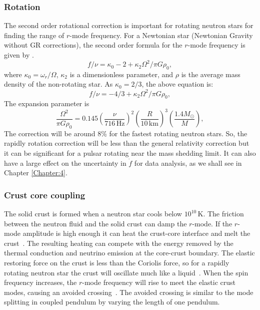 \documentclass{ttuthes2007}
\begin{document}
\subsubsection{Rotation}
The second order rotational correction is important for rotating neutron stars for finding the range of $r$-mode frequency.
For a  Newtonian star (Newtonian Gravity without \ac{GR} corrections), the second order formula for the $r$-mode frequency is given by 
\cite{Lindblom_1999}.
\begin{equation}
f/\nu=\kappa_0 - 2 + \kappa_2 \Omega^2/\pi G \rho_0,
\end{equation}
where $\kappa_0=\omega_r/\Omega$, $\kappa_2$ is a dimensionless parameter,
and $\rho$ is the average mass density of the non-rotating star.
As $\kappa_0=2/3$, the above equation is:
\begin{equation}
f/\nu = -4/3 + \kappa_2 \Omega^2/\pi G \rho_0,
\end{equation}
The expansion parameter is
\begin{equation}
\frac{\Omega^2}{\pi G \rho_0}=0.145 \left(\frac{\nu}{716\,\mathrm{Hz}}\right)^2
\left(\frac{R}{10\,\mathrm{km}}\right)^3 \left(\frac{1.4M_\odot}{M}\right),
\end{equation}
The correction
will be around 8\% for the fastest rotating neutron stars. So, the rapidly rotation correction will be less than the general relativity correction but it can be
significant for a pulsar rotating near the mass shedding limit. It can also have
a large effect on the uncertainty in $\dot{f}$ for data analysis, as we shall
see in Chapter \ref{Chapter:4}.

\subsubsection{Crust core coupling}
The solid crust is formed when a neutron star cools below
$10^{10}$\,K. The friction between the neutron fluid and the solid crust can damp
the $r$-mode. If the $r$-mode amplitude is high enough it can heat the crust-core
interface and melt the crust~\cite{Lindblom_2000}. The resulting heating can compete with the
energy
removed by the thermal
conduction and neutrino emission at the core-crust boundary. The elastic restoring
force on the crust is less than the Coriolis force, so for a rapidly rotating neutron
star the crust will oscillate much like a liquid~\cite{Levin_2001}. When the spin frequency increases, the $r$-mode
frequency will rise to meet the elastic crust modes, causing an avoided
crossing~\cite{Levin_2001}. The avoided crossing is
similar to the mode splitting in coupled pendulum by varying the length of one
pendulum. 
\end{document}
